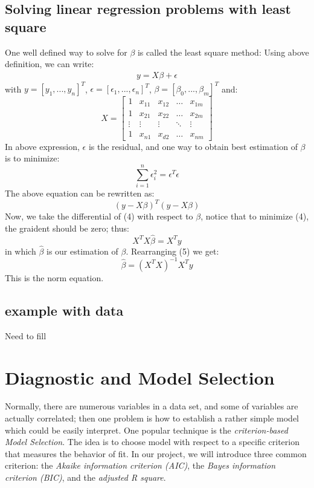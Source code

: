 \documentclass[a4paper, 11pt]{article}
\begin{document}
\subsection{Solving linear regression problems with least square}
One well defined way to solve for $\beta$ is called the least square method: \newline
Using above definition, we can write:\begin{align*}
y = X \beta + \epsilon
\end{align*} 
with $y = [y_1, ..., y_n]^T$, $\epsilon = [\epsilon_1,..., \epsilon_n]^T$, $\beta = [\beta_0,...,\beta_m]^T$ and:\begin{equation}
    X = \begin{bmatrix}
    1 & x_{11}& x_{12}  & \dots & x_{1m} \\
    1 & x_{21}& x_{22}  & \dots & x_{2m} \\
    \vdots & \vdots & \vdots & \ddots & \vdots \\
    1 & x_{n1}& x_{d2}  & \dots & x_{nm}
\end{bmatrix}
\end{equation}
In above expression, $\epsilon$ is the residual, and one way to obtain best estimation of $\beta$ is to minimize:\begin{equation}
    \sum_{i=1}^n \epsilon_i^2 = \epsilon^T\epsilon
\end{equation}
The above equation can be rewritten as: \begin{equation}
    (y - X\beta)^T (y - X\beta) 
\end{equation}
Now, we take the differential of (4) with respect to $\beta$, notice that to minimize (4), the graident should be zero; thus: \begin{equation}
    X^TX\hat{\beta} = X^T y 
\end{equation}
in which $\hat{\beta}$ is our estimation of $\beta$. Rearranging (5) we get: \begin{equation}
     \hat{\beta} = (X^TX)^{-1}X^T y
\end{equation}
This is the norm equation. 
\subsection{example with data}
Need to fill
\section{Diagnostic and Model Selection}
Normally, there are numerous variables in a data set, and some of variables are actually correlated; then one problem is how to establish a rather simple model which could be easily interpret. One popular technique is the \emph{criterion-based Model Selection}. The idea is to choose model with respect to a specific criterion that measures the behavior of fit. In our project, we will introduce three common criterion: the \emph{Akaike information criterion (AIC)}, the \emph{Bayes information criterion (BIC)}, and the \emph{adjusted R square}. 
\end{document}
